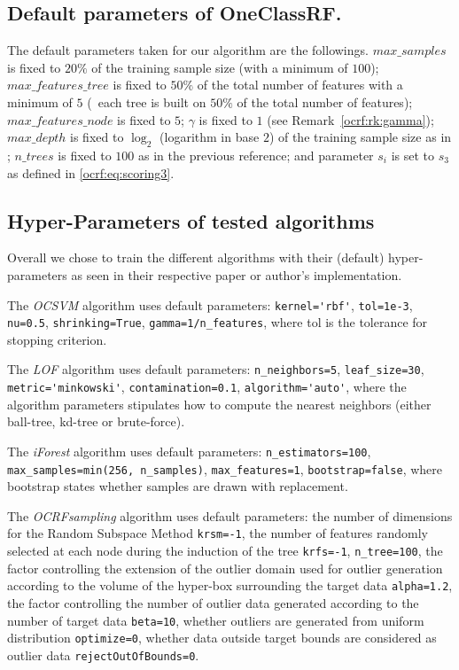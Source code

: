 \subsection{Default parameters of OneClassRF.}
The default parameters taken for our algorithm are the followings.
%
$max\_samples$ is fixed to $20\%$ of the training sample size (with a minimum of $100$); $max\_features\_tree$ is fixed to $50\%$ of the total number of features with a minimum of $5$ (\ie~each tree is built on $50\%$ of the total number of features); $max\_features\_node$ is fixed to $5$; $\gamma$ is fixed to $1$ (see Remark~\ref{ocrf:rk:gamma}); $max\_depth$ is fixed to $\log_2$ (logarithm in base $2$) of the training sample size as in \cite{Liu2008}; $n\_trees$ is fixed to $100$ as in the previous reference; and parameter $s_i$ is set to $s_3$ as defined in \eqref{ocrf:eq:scoring3}.

\subsection{Hyper-Parameters of tested algorithms}
Overall we chose to train the different algorithms with their (default) hyper-parameters as seen
in their respective paper or author's implementation.

The \emph{OCSVM} algorithm uses default parameters: \verb+kernel='rbf'+, \verb+tol=1e-3+,
\verb+nu=0.5+, \verb+shrinking=True+, \verb+gamma=1/n_features+, where tol is the tolerance for stopping criterion.

The \emph{LOF} algorithm uses default parameters:
\verb+n_neighbors=5+, \verb+leaf_size=30+, \verb+metric='minkowski'+,
\verb+contamination=0.1+, \verb+algorithm='auto'+, where the algorithm parameters stipulates
how to compute the nearest neighbors (either ball-tree, kd-tree or brute-force).

The \emph{iForest} algorithm uses default parameters:
\verb+n_estimators=100+, \verb+max_samples=min(256, n_samples)+,
\verb+max_features=1+, \verb+bootstrap=false+, where bootstrap states whether samples are drawn with replacement.

The \emph{OCRFsampling} algorithm uses default parameters:
the number of dimensions for the Random Subspace Method \verb+krsm=-1+,
the number of features randomly selected at each node during the induction of the tree \verb+krfs=-1+,
\verb+n_tree=100+,
the factor controlling the extension of the outlier domain used for outlier generation according to the volume of the hyper-box surrounding the target data \verb+alpha=1.2+,
the factor controlling the number of outlier data generated according to the number of target data \verb+beta=10+,
whether outliers are generated from uniform distribution \verb+optimize=0+,
whether data outside target bounds are considered as outlier data \verb+rejectOutOfBounds=0+.

